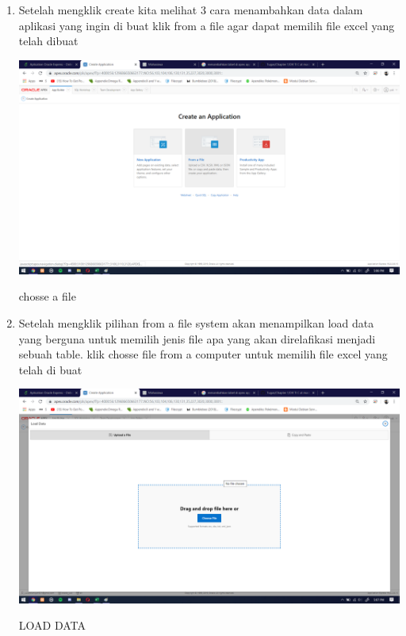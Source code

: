 \documentclass{article}
\begin{document}
\begin{enumerate}
      \item Setelah mengklik create kita melihat 3 cara menambahkan data dalam aplikasi yang ingin di buat klik from a file agar dapat memilih file excel yang telah dibuat
    \begin{center}
         \centering
            \includegraphics[scale=0.27]{figures/DB2.png}
        \caption{chosse a file}
        \label{from}
    \end{center}
    
    \item Setelah mengklik pilihan from a file system akan menampilkan load data yang berguna untuk memilih jenis file apa yang akan direlafikasi menjadi sebuah table. klik chosse file from a computer untuk memilih file excel yang telah di buat
    \begin{center}
         \centering
            \includegraphics[scale=0.27]{figures/DB3.png}
        \caption{LOAD DATA}
        \label{chosse}
    \end{center}
    

\end{enumerate}
\end{document}
